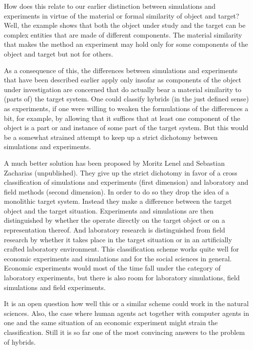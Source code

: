\documentclass[12pt, a4paper]{article}
\numberwithin{equation}{section}
\begin{document}
How does this relate to our earlier distinction between simulations and experiments in virtue of the material or formal similarity of object and target? Well, the example shows that both the object under study and the target can be complex entities that are made of different components. The material similarity that makes the method an experiment may hold only for some components of the object and target but not for others. 

As a consequence of this, the differences between simulations and experiments that have been described earlier apply only insofar as components of the object under investigation are concerned that do actually bear a material similarity to (parts of) the target system. One could classify hybrids (in the just defined sense) as experiments, if one were willing to weaken the formulations of the differences a bit, for example, by allowing that it suffices that at least one component of the object is a part or and instance of some part of the target system. But this would be a somewhat strained attempt to keep up a strict dichotomy between simulations and experiments.

A much better solution has been proposed by Moritz Lenel and Sebastian Zacharias (unpublished). They give up the strict dichotomy in favor of a cross classification of simulations and experiments (first dimension) and laboratory and field methods (second dimension). In order to do so they drop the idea of a monolithic target system. Instead they make a difference between the target object and the target situation. Experiments and simulations are then distinguished by whether the operate directly on the target object or on a representation thereof. And laboratory research is distinguished from field research by whether it takes place in the target situation or in an artificially crafted laboratory environment. This classification scheme works quite well for economic experiments and simulations and for the social sciences in general. Economic experiments would most of the time fall under the category of laboratory experiments, but there is also room for laboratory simulations, field simulations and field experiments.

It is an open question how well this or a similar scheme could work in the natural sciences. Also, the case where human agents act together with computer agents in one and the same situation of an economic experiment might strain the classification. Still it is so far one of the most convincing answers to the problem of hybrids.
\end{document}
